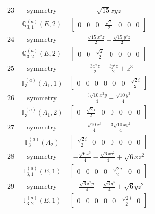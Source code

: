 \documentclass[fleqn,8pt,landscape]{jsarticle}
\begin{document}
\begin{longtable}{ccc}
$ 23 $ & $ \text{symmetry} $ & $ \sqrt{15} x y z $ \\
$  $ & $ \mathbb{Q}_{3,1}^{(a)}(E,2) $ & $ \begin{bmatrix} 0 & 0 & 0 & \frac{\sqrt{2}}{2} & 0 & 0 & 0 \end{bmatrix} $ \\ \hline
$ 24 $ & $ \text{symmetry} $ & $ \frac{\sqrt{15} x^{2} z}{2} - \frac{\sqrt{15} y^{2} z}{2} $ \\
$  $ & $ \mathbb{Q}_{3,2}^{(a)}(E,2) $ & $ \begin{bmatrix} 0 & 0 & \frac{\sqrt{2}}{2} & 0 & 0 & 0 & 0 \end{bmatrix} $ \\ \hline
$ 25 $ & $ \text{symmetry} $ & $ - \frac{3 x^{2} z}{2} - \frac{3 y^{2} z}{2} + z^{3} $ \\
$  $ & $ \mathbb{T}_{3}^{(a)}(A_{1},1) $ & $ \begin{bmatrix} 0 & 0 & 0 & 0 & 0 & 0 & \frac{\sqrt{2} i}{2} \end{bmatrix} $ \\ \hline
$ 26 $ & $ \text{symmetry} $ & $ \frac{3 \sqrt{10} x^{2} y}{4} - \frac{\sqrt{10} y^{3}}{4} $ \\
$  $ & $ \mathbb{T}_{3}^{(a)}(A_{1},2) $ & $ \begin{bmatrix} 0 & \frac{\sqrt{2} i}{2} & 0 & 0 & 0 & 0 & 0 \end{bmatrix} $ \\ \hline
$ 27 $ & $ \text{symmetry} $ & $ \frac{\sqrt{10} x^{3}}{4} - \frac{3 \sqrt{10} x y^{2}}{4} $ \\
$  $ & $ \mathbb{T}_{3}^{(a)}(A_{2}) $ & $ \begin{bmatrix} \frac{\sqrt{2} i}{2} & 0 & 0 & 0 & 0 & 0 & 0 \end{bmatrix} $ \\ \hline
$ 28 $ & $ \text{symmetry} $ & $ - \frac{\sqrt{6} x^{3}}{4} - \frac{\sqrt{6} x y^{2}}{4} + \sqrt{6} x z^{2} $ \\
$  $ & $ \mathbb{T}_{3,1}^{(a)}(E,1) $ & $ \begin{bmatrix} 0 & 0 & 0 & 0 & \frac{\sqrt{2} i}{2} & 0 & 0 \end{bmatrix} $ \\ \hline
$ 29 $ & $ \text{symmetry} $ & $ - \frac{\sqrt{6} x^{2} y}{4} - \frac{\sqrt{6} y^{3}}{4} + \sqrt{6} y z^{2} $ \\
$  $ & $ \mathbb{T}_{3,2}^{(a)}(E,1) $ & $ \begin{bmatrix} 0 & 0 & 0 & 0 & 0 & \frac{\sqrt{2} i}{2} & 0 \end{bmatrix} $ \\ \hline

\end{longtable}
\end{document}
